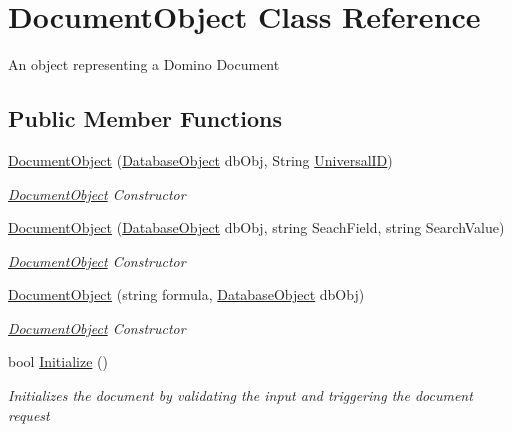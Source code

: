 \hypertarget{class_document_object}{}\section{Document\+Object Class Reference}
\label{class_document_object}


An object representing a Domino Document  


\subsection*{Public Member Functions}
\begin{DoxyCompactItemize}
\item 
\hyperlink{class_document_object_a46c89e7d40b15a91542a5482b2d8a084}{Document\+Object} (\hyperlink{class_database_object}{Database\+Object} db\+Obj, String \hyperlink{class_document_object_a8b96d04632a2802e7cc5466ca5cee8cf}{Universal\+ID})
\begin{DoxyCompactList}\small\item\em \hyperlink{class_document_object}{Document\+Object} Constructor \end{DoxyCompactList}\item 
\hyperlink{class_document_object_a7c98c6485f7395697561500a8ff42d79}{Document\+Object} (\hyperlink{class_database_object}{Database\+Object} db\+Obj, string Seach\+Field, string Search\+Value)
\begin{DoxyCompactList}\small\item\em \hyperlink{class_document_object}{Document\+Object} Constructor \end{DoxyCompactList}\item 
\hyperlink{class_document_object_a4eb6c7aaa4774d1d5dbf5bf17dff23d9}{Document\+Object} (string formula, \hyperlink{class_database_object}{Database\+Object} db\+Obj)
\begin{DoxyCompactList}\small\item\em \hyperlink{class_document_object}{Document\+Object} Constructor \end{DoxyCompactList}\item 
bool \hyperlink{class_document_object_af4298d6cfbb9ea60643d9995309b73f1}{Initialize} ()
\begin{DoxyCompactList}\small\item\em Initializes the document by validating the input and triggering the document request \end{DoxyCompactList}\item 

\end{DoxyCompactItemize}
